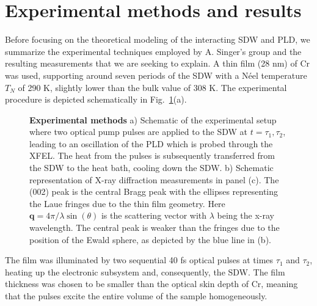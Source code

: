 \section{Experimental methods and results \label{sec:Cr_experiment}}
Before focusing on the theoretical modeling of the interacting \gls{SDW} and \gls{PLD}, we summarize the experimental techniques employed by A. Singer's group and the resulting measurements that we are seeking to explain.
A thin film (28 nm) of Cr was used, supporting around seven periods of the \gls{SDW} with a N\'eel temperature $T_N$ of 290 K, slightly lower than the bulk value of 308 K.
The experimental procedure is depicted schematically in Fig.~\ref{fig:Cr_schematic}(a). 
\begin{figure}[h]
\caption{\label{fig:Cr_schematic}{\bf Experimental methods} a) Schematic of the experimental setup where two optical pump pulses are applied to the \gls{SDW} at $t=\tau_1,\tau_2$, leading to an oscillation of the \gls{PLD} which is probed through the \gls{XFEL}. The heat from the pulses is subsequently transferred from the \gls{SDW} to the heat bath, cooling down the \gls{SDW}. b) Schematic representation of X-ray diffraction measurements in panel (c). The (002) peak is the central Bragg peak with the ellipses representing the Laue fringes due to the thin film geometry. Here $\bm q=4\pi/\lambda \sin(\theta)$ is the scattering vector with $\lambda$ being the x-ray wavelength. The central peak is weaker than the fringes due to the position of the Ewald sphere, as depicted by the blue line in (b).}
\end{figure}
The film was illuminated by two sequential 40 fs optical pulses at times $\tau_1$ and $\tau_2$, heating up the electronic subsystem and, consequently, the \gls{SDW}.
The film thickness was chosen to be smaller than the optical skin depth of Cr, meaning that the pulses excite the entire volume of the sample homogeneously.

